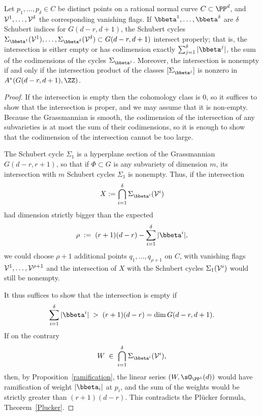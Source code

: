 \begin{theorem}\label{osculating intersection}
Let $p_1,\dots,p_\delta \in C$ be distinct points on a rational normal curve $C \subset \PP^d$, and ${\cal V}^1, \dots, {\cal V}^\delta$ the corresponding vanishing flags. If ${\bbeta}^1, \dots, {\bbeta}^\delta$ are $\delta$ Schubert indices for $G(d-r, d+1)$, the Schubert cycles $\Sigma_{{\bbeta}^1}({\cal V}^1), \dots, \Sigma_{{\bbeta}^\delta}({\cal V}^\delta) \subset G(d-r, d+1)$ intersect properly; that is, the intersection is either empty or has codimension exactly $\sum_{j =1}^{\delta}|\bbeta^{j}|$,
the sum of the codimensions of the cycles $\Sigma_{{\bbeta}^j}$. Moreover, the intersection is nonempty if and only if
 the intersection product of the classes $[\Sigma_{{\bbeta}^j}]$ is nonzero in $A^*(G(d-r, d+1), \ZZ)$.
\end{theorem}


\begin{proof} 
If the intersection is empty then the cohomology class is 0, so it suffices to show that the intersection is proper,
and we may assume that it is non-empty. Because the Grassmannian is smooth, the codimension of the intersection of any subvarieties
 is at most the sum of their codimensions, so it is enough to show that the codimension of the
 intersection cannot be too large.

The Schubert cycle $\Sigma_1$ is a hyperplane section of the Grassmannian $G(d-r, r+1)$, so that if $\Phi \subset G$ is any subvariety of dimension $m$, its intersection with $m$ Schubert cycles $\Sigma_1$ is nonempty. Thus, if the intersection
$$
X := \bigcap_{i=1}^\delta \Sigma_{{\bbeta}^i}({\cal V}^i)
$$
had dimension strictly bigger than the expected
$$
\rho \; := \; (r+1)(d-r) - \sum_{i=1}^\delta |{\bbeta}^i|,
$$
we could choose $\rho + 1$ additional points $q_1,\dots,q_{\rho + 1}$ on $C$, with vanishing flags ${\cal V}^1, \dots, {\cal V}^{\rho + 1}$ and the intersection of $X$ with the Schubert cycles $\Sigma_1({\cal V}^i)$ would still be nonempty.

It thus suffices to show that the intersection is empty if
$$
\sum_{i=1}^\delta |{\bbeta}^i| \; > \; (r+1)(d-r) = \dim G(d-r, d+1).
$$
If on the contrary 
$$
W \; \in \; \bigcap_{i=1}^\delta \Sigma_{{\bbeta}^i}({\cal V}^i),
$$
then, by Proposition~\ref{ramification}, the linear series $(W, \sO_{\PP^{1}}(d))$  would have
ramification of weight $|{\bbeta_i}|$ at $p_i$, and the sum of the weights would be strictly greater than $(r+1)(d-r)$. 
This contradicts the Pl\"ucker formula, Theorem~\ref{Plucker}.
\end{proof}

